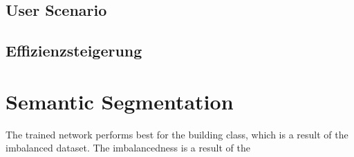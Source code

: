 \subsection{User Scenario}

\subsection{Effizienzsteigerung}

\section{Semantic Segmentation}
The trained network performs best for the building class, which is a result of the imbalanced dataset. The imbalancedness is a result of the 